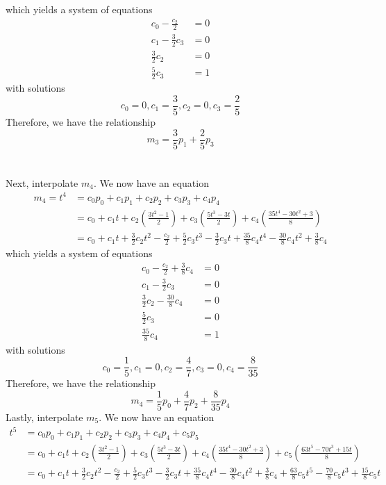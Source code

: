 which yields a system of equations
\begin{align*}
c_0-\frac{c_2}{2} &= 0\\
c_1-\frac{3}{2}c_3 &= 0\\
\frac{3}{2}c_2 &= 0\\
\frac{5}{2}c_3 &= 1
\end{align*}
with solutions
\begin{equation*}
c_0 = 0, c_1 = \frac{3}{5}, c_2 = 0, c_3 = \frac{2}{5}
\end{equation*}
Therefore, we have the relationship
\begin{equation*}
\boxed{m_3 = \frac{3}{5}p_1 + \frac{2}{5}p_3}
\end{equation*}
\\
\\
Next, interpolate $m_4$. We now have an equation
\begin{align*}
m_4 = t^4 &= c_0p_0 + c_1p_1 + c_2p_2 + c_3p_3 + c_4p_4\\
&= c_0 + c_1t + c_2 \left(\frac{3t^2-1}{2}\right) + c_3 \left(\frac{5t^3-3t}{2}\right) + c_4 \left(\frac{35t^4-30t^2+3}{8}\right)\\
&= c_0 + c_1t + \frac{3}{2}c_2t^2 - \frac{c_2}{2} + \frac{5}{2}c_3t^3 - \frac{3}{2}c_3t + \frac{35}{8}c_4t^4 - \frac{30}{8}c_4t^2 + \frac{3}{8}c_4
\end{align*}
which yields a system of equations
\begin{align*}
c_0-\frac{c_2}{2} + \frac{3}{8}c_4 &= 0\\
c_1-\frac{3}{2}c_3 &= 0\\
\frac{3}{2}c_2 - \frac{30}{8}c_4 &= 0\\
\frac{5}{2}c_3 &= 0\\
\frac{35}{8}c_4 &= 1
\end{align*}
with solutions
\begin{equation*}
c_0 = \frac{1}{5}, c_1 = 0, c_2 = \frac{4}{7}, c_3 = 0, c_4 = \frac{8}{35}
\end{equation*}
Therefore, we have the relationship
\begin{equation*}
\boxed{m_4 = \frac{1}{5}p_0 + \frac{4}{7}p_2 + \frac{8}{35}p_4}
\end{equation*}
Lastly, interpolate $m_5$. We now have an equation
\begin{align*}
t^5 &= c_0p_0 + c_1p_1 + c_2p_2 + c_3p_3 + c_4p_4 + c_5p_5\\
&= c_0 + c_1t + c_2 \left(\frac{3t^2-1}{2}\right) + c_3 \left(\frac{5t^3-3t}{2}\right) + c_4 \left(\frac{35t^4-30t^2+3}{8}\right) + c_5 \left(\frac{63t^5-70t^3+15t}{8}\right)\\
&= c_0 + c_1t + \frac{3}{2}c_2t^2 - \frac{c_2}{2} + \frac{5}{2}c_3t^3 - \frac{3}{2}c_3t + \frac{35}{8}c_4t^4 - \frac{30}{8}c_4t^2 + \frac{3}{8}c_4 + \frac{63}{8}c_5t^5 - \frac{70}{8}c_5t^3 + \frac{15}{8}c_5t
\end{align*}
